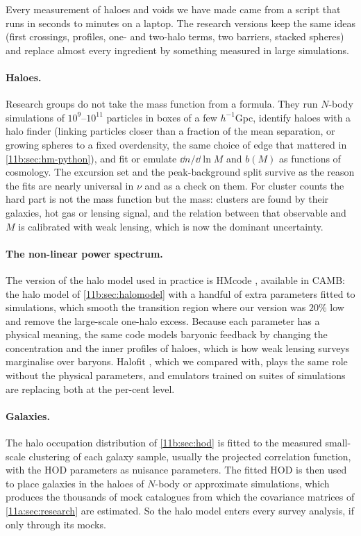 Every measurement of haloes and voids we have made came from a script that runs
in seconds to minutes on a laptop. The research
versions keep the same ideas (first crossings, profiles, one- and two-halo terms,
two barriers, stacked spheres) and replace almost every ingredient by something
measured in large simulations.

\paragraph{Haloes.}
Research groups do not take the mass function from a formula. They run $N$-body
simulations of $10^9$--$10^{11}$ particles in boxes of a few $h^{-1}$Gpc, identify
haloes with a halo finder (linking particles closer than a fraction of the mean
separation, or growing spheres to a fixed overdensity, the same choice of edge that
mattered in \cref{11b:sec:hm-python}), and fit or emulate $\dd n/\dd\ln M$ and
$b(M)$ as functions of cosmology. The excursion set and the peak-background split
survive as the reason the fits are nearly universal in $\nu$ and as a check on
them. For cluster counts the hard part is not the mass function but the
mass: clusters are found by their galaxies, hot gas or lensing signal, and the
relation between that observable and $M$ is calibrated with weak lensing, which
is now the dominant uncertainty.

\paragraph{The non-linear power spectrum.}
The version of the halo model used in practice is HMcode \cite{Mead2015},
available in CAMB: the halo model of \cref{11b:sec:halomodel} with a handful of
extra parameters fitted to simulations, which smooth the transition region where
our version was $20\%$ low and remove the large-scale one-halo excess. Because each
parameter has a physical meaning, the same code models baryonic feedback by
changing the concentration and the inner profiles of haloes, which is how weak
lensing surveys marginalise over baryons. Halofit \cite{Takahashi2012}, which
we compared with, plays the same role without the physical parameters, and
emulators trained on suites of simulations are replacing both at the per-cent
level.

\paragraph{Galaxies.}
The halo occupation distribution of \cref{11b:sec:hod} is fitted to the measured
small-scale clustering of each galaxy sample, usually the projected correlation
function, with the HOD parameters as nuisance parameters. The fitted HOD is then
used to place galaxies in the haloes of $N$-body or approximate simulations, which
produces the thousands of mock catalogues from which the covariance matrices of
\cref{11a:sec:research} are estimated. So the halo model enters every survey
analysis, if only through its mocks.

